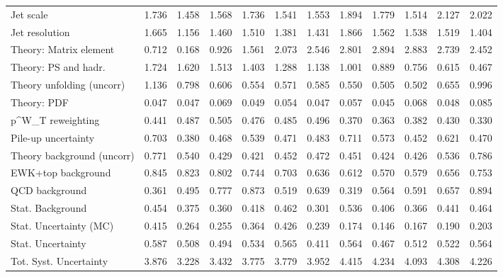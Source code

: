 \begin{tabular}{l|p{0.6cm}p{0.6cm}p{0.6cm}p{0.6cm}p{0.6cm}p{0.6cm}p{0.6cm}p{0.6cm}p{0.6cm}p{0.6cm}p{0.6cm}}
Jet scale                                & 1.736 & 1.458 & 1.568 & 1.736 & 1.541 & 1.553 & 1.894 & 1.779 & 1.514 & 2.127 & 2.022 \\
Jet resolution                           & 1.665 & 1.156 & 1.460 & 1.510 & 1.381 & 1.431 & 1.866 & 1.562 & 1.538 & 1.519 & 1.404 \\
Theory: Matrix element                   & 0.712 & 0.168 & 0.926 & 1.561 & 2.073 & 2.546 & 2.801 & 2.894 & 2.883 & 2.739 & 2.452 \\
Theory: PS and hadr.                     & 1.724 & 1.620 & 1.513 & 1.403 & 1.288 & 1.138 & 1.001 & 0.889 & 0.756 & 0.615 & 0.467 \\
Theory unfolding (uncorr)                & 1.136 & 0.798 & 0.606 & 0.554 & 0.571 & 0.585 & 0.550 & 0.505 & 0.502 & 0.655 & 0.996 \\
Theory: PDF                              & 0.047 & 0.047 & 0.069 & 0.049 & 0.054 & 0.047 & 0.057 & 0.045 & 0.068 & 0.048 & 0.085 \\
p^{W}_{T} reweighting                    & 0.441 & 0.487 & 0.505 & 0.476 & 0.485 & 0.496 & 0.370 & 0.363 & 0.382 & 0.430 & 0.330 \\
Pile-up uncertainty                      & 0.703 & 0.380 & 0.468 & 0.539 & 0.471 & 0.483 & 0.711 & 0.573 & 0.452 & 0.621 & 0.470 \\
Theory background (uncorr)               & 0.771 & 0.540 & 0.429 & 0.421 & 0.452 & 0.472 & 0.451 & 0.424 & 0.426 & 0.536 & 0.786 \\
EWK+top background                       & 0.845 & 0.823 & 0.802 & 0.744 & 0.703 & 0.636 & 0.612 & 0.570 & 0.579 & 0.656 & 0.753 \\
QCD background                           & 0.361 & 0.495 & 0.777 & 0.873 & 0.519 & 0.639 & 0.319 & 0.564 & 0.591 & 0.657 & 0.894 \\
Stat. Background                         & 0.454 & 0.375 & 0.360 & 0.418 & 0.462 & 0.301 & 0.536 & 0.406 & 0.366 & 0.441 & 0.464 \\
Stat. Uncertainty (MC)                   & 0.415 & 0.264 & 0.255 & 0.364 & 0.426 & 0.239 & 0.174 & 0.146 & 0.167 & 0.190 & 0.203 \\
\hline
Stat. Uncertainty                        & 0.587 & 0.508 & 0.494 & 0.534 & 0.565 & 0.411 & 0.564 & 0.467 & 0.512 & 0.522 & 0.564 \\
\hline
Tot. Syst. Uncertainty                   & 3.876 & 3.228 & 3.432 & 3.775 & 3.779 & 3.952 & 4.415 & 4.234 & 4.093 & 4.308 & 4.226 \\
\hline
\end{tabular}
